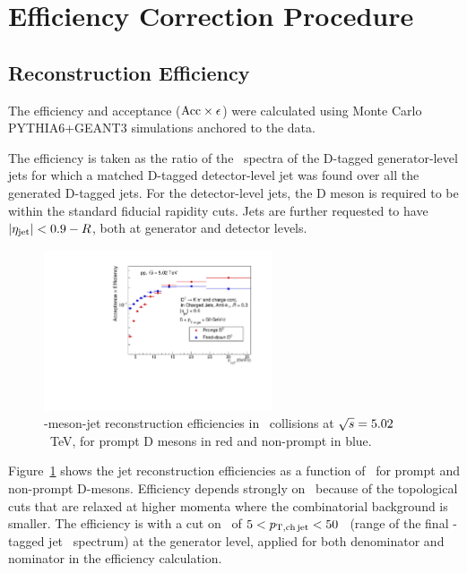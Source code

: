 
\section{Efficiency Correction Procedure}

\subsection{Reconstruction Efficiency}
\label{sect:sub_DmesonRecEff}
The efficiency and acceptance (${\rm Acc} \times \epsilon$) were calculated using Monte Carlo PYTHIA6+GEANT3 simulations anchored to the data.

The efficiency is taken as the ratio of the \ptd\ spectra of the D-tagged generator-level jets for which a matched
D-tagged detector-level jet was found over all the generated D-tagged jets.
For the detector-level jets, the D meson is required to be within the standard fiducial rapidity cuts.
Jets are further requested to have $|\eta_{\rm jet}| < 0.9 - R$, both at generator and detector levels.

\begin{figure}[bth]
\centering
\includegraphics[width=0.6\textwidth]{pPbcuts_2sig/DjetEff_Sim_log}
\caption{\Dzero-meson-jet reconstruction efficiencies in \pp\ collisions at $\sqrt{s}=5.02$~TeV, for prompt D mesons in red and non-prompt in blue.}
\label{fig:eq_pp_DrecEff}
\end{figure}

Figure~\ref{fig:eq_pp_DrecEff} shows the \Dzero\-jet reconstruction efficiencies as a function of \ptd\, 
for prompt and non-prompt D-mesons. Efficiency depends strongly on \ptd\ because of the topological cuts that are relaxed at higher momenta where the combinatorial background is smaller. 
The efficiency is with a cut on \ptchjet\ of $5 < p_{\mathrm{T,ch\, jet}} < 50$ \GeVc\ (range of the final \Dzero-tagged jet \pt\ spectrum) at the generator level, applied for both denominator and nominator in the efficiency calculation.

